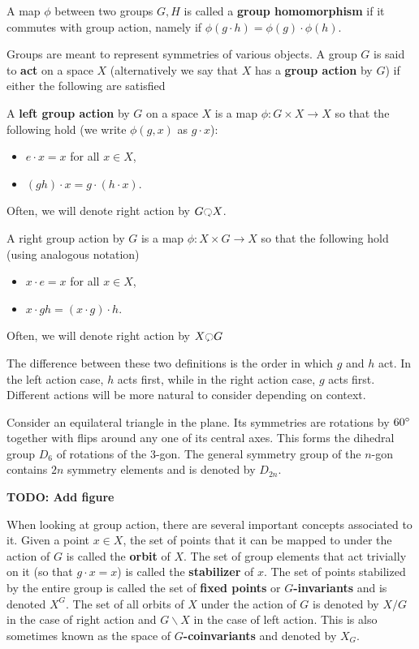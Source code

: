 		A map $\phi$ between two groups $G, H$ is called a \textbf{group homomorphism} if it commutes with group action, namely if $\phi(g \cdot h) = \phi(g) \cdot \phi(h)$.
		
		Groups are meant to represent symmetries of various objects. A group $G$ is said to \textbf{act} on a space $X$ (alternatively we say that $X$ has a \textbf{group action} by $G$) if either the following are satisfied
		\begin{defn}
			A \textbf{left group action} by $G$ on a space $X$ is a map $\phi: G \times X \to X$ so that the following hold (we write $\phi(g, x)$ as $g\cdot x$):
			\begin{itemize}
				\item $e \cdot x = x$ for all $x \in X$,
				\item $(gh)\cdot x = g\cdot(h \cdot x)$. 
			\end{itemize}
			Often, we will denote right action by $G \lacts X$.
			
			A right group action by $G$ is a map $\phi: X \times G \to X$ so that the following hold (using analogous notation)
			\begin{itemize}
				\item $x \cdot e = x$ for all $x \in X$,
				\item $x \cdot gh = (x \cdot g) \cdot h$.
			\end{itemize}
			Often, we will denote right action by $X \racts G$
		\end{defn}
		The difference between these two definitions is the order in which $g$ and $h$ act. In the left action case, $h$ acts first, while in the right action case, $g$ acts first. Different actions will be more natural to consider depending on context.
		
		\begin{eg}
			Consider an equilateral triangle in the plane. Its symmetries are rotations by $60\degree$ together with flips around any one of its central axes. This forms the dihedral group $D_6$ of rotations of the $3$-gon. The general symmetry group of the $n$-gon contains $2n$ symmetry elements and is denoted by $D_{2n}$.
		\end{eg}
		\textbf{TODO: Add figure}

		When looking at group action, there are several important concepts associated to it. Given a point $x \in X$, the set of points that it can be mapped to under the action of $G$ is called the \textbf{orbit} of $X$. The set of group elements that act trivially on it (so that $g \cdot x = x$) is called the \textbf{stabilizer} of $x$. The set of points stabilized by the entire group is called the set of \textbf{fixed points} or $G$\textbf{-invariants} and is denoted $X^G$. The set of all orbits of $X$ under the action of $G$ is denoted by $X/G$ in the case of right action and $G\backslash X$ in the case of left action. This is also sometimes known as the space of $G$\textbf{-coinvariants} and denoted by $X_G$.
		
